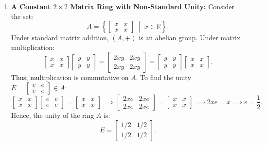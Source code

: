 \documentclass[11pt,a4paper]{article}
\begin{document}
\begin{enumerate}[label=\textbf{\arabic*)}]
    \item \textbf{A Constant $2 \times 2$ Matrix Ring with Non-Standard Unity:} Consider the set:
    \[
    A = \left\{ \begin{bmatrix} x & x \\ x & x \end{bmatrix} \;\middle|\; x \in \mathbb{R} \right\}.
    \]
    Under standard matrix addition, $(A, +)$ is an abelian group. Under matrix multiplication:
    \[
    \begin{bmatrix} x & x \\ x & x \end{bmatrix} \begin{bmatrix} y & y \\ y & y \end{bmatrix} = \begin{bmatrix} 2xy & 2xy \\ 2xy & 2xy \end{bmatrix} = \begin{bmatrix} y & y \\ y & y \end{bmatrix} \begin{bmatrix} x & x \\ x & x \end{bmatrix}.
    \]
    Thus, multiplication is commutative on $A$. To find the unity $E = \begin{bmatrix} e & e \\ e & e \end{bmatrix} \in A$:
    \[
    \begin{bmatrix} x & x \\ x & x \end{bmatrix} \begin{bmatrix} e & e \\ e & e \end{bmatrix} = \begin{bmatrix} x & x \\ x & x \end{bmatrix} \implies \begin{bmatrix} 2xe & 2xe \\ 2xe & 2xe \end{bmatrix} = \begin{bmatrix} x & x \\ x & x \end{bmatrix} \implies 2xe = x \implies e = \frac{1}{2}.
    \]
    Hence, the unity of the ring $A$ is:
    \[
    E = \begin{bmatrix} 1/2 & 1/2 \\ 1/2 & 1/2 \end{bmatrix}.
\]
\end{enumerate}
\end{document}
